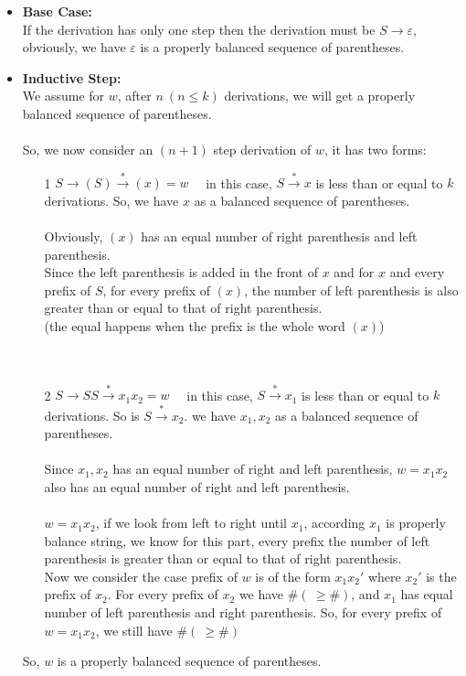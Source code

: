 \documentclass [9 pt]{article}
\theoremstyle{definition}
\begin{document}
\begin{itemize}
	\item \textbf{Base Case:} \\
	If the derivation has only one step then the derivation must be $S\to \varepsilon $, obviously, we have $\varepsilon$ is a properly balanced sequence of parentheses.
	\item \textbf{Inductive Step:}\\
	We assume for $w$, after $n \ (n \leq k)$ derivations, we will get a properly balanced sequence of parentheses.\\\\
	So, we now consider an $(n + 1)$ step derivation of $w$, it has two forms:
	\begin{itemize}
		\item[1] $S \to (S) \xrightarrow{*} (x) = w \quad $ in this case, $S \xrightarrow{*} x$ is less than or equal to $k$ derivations. So, we have $x$ as a balanced sequence of parentheses.\\\\
		Obviously, $(x)$ has an equal number of right parenthesis and left parenthesis. \\
		Since the left parenthesis is added in the front of $x$ and for $x$ and every prefix of $S$,  for every prefix of $(x)$, the number of left parenthesis is also greater than or equal to that of right parenthesis.\\
 		 \bigg(the equal happens when the prefix is the whole word $(x)$\bigg)\\
  		\\
  		\\
  		\item[2] $S \to SS \xrightarrow{*} x_1x_2 = w \quad $ in this case, $S \xrightarrow{*} x_1$ is less than or equal to $k$ derivations. So is $S \xrightarrow{*} x_2$. we have $x_1, x_2$ as a balanced sequence of parentheses.\\\\
  		Since $x_1, x_2$ has an equal number of right and left parenthesis, $w = x_1x_2$ also has an equal number of right and left parenthesis.\\
  		\\
  		$w = x_1x_2$, if we look from left to right until $x_1$, according $x_1$ is properly balance string, we know for this part, every prefix the number of left parenthesis is greater than or equal to that of right parenthesis.\\
  		Now we consider the case prefix of $w$ is of the form $x_1x_2'$ where  $x_2'$ is the prefix of $x_2$. For every prefix of $x_2$ we have $\#( \ \geq \# )$, and $x_1$ has equal number of left parenthesis and right parenthesis. So, for every prefix of $w = x_1x_2$, we still have $\#( \ \geq \# )$ \\
	\end{itemize}
	 So, $w$ is a properly balanced sequence of parentheses.
\end{itemize}
\end{document}
